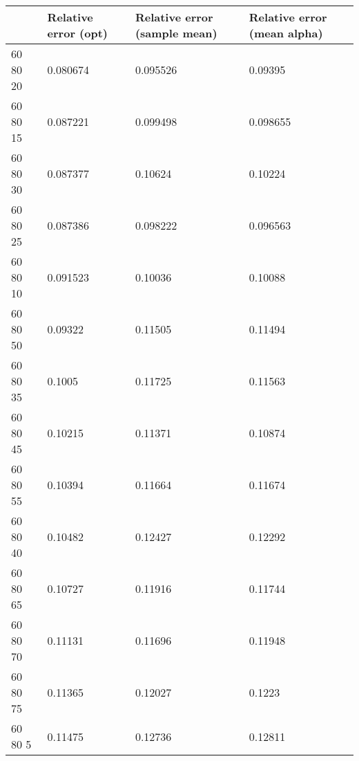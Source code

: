 \begin{tabular}{llll}
& Relative error (opt) & Relative error (sample mean) & Relative error (mean alpha) \\ 
\hline 
60  80  20 & 0.080674 & 0.095526 & 0.09395 \\ \hline 
60  80  15 & 0.087221 & 0.099498 & 0.098655 \\ \hline 
60  80  30 & 0.087377 & 0.10624 & 0.10224 \\ \hline 
60  80  25 & 0.087386 & 0.098222 & 0.096563 \\ \hline 
60  80  10 & 0.091523 & 0.10036 & 0.10088 \\ \hline 
60  80  50 & 0.09322 & 0.11505 & 0.11494 \\ \hline 
60  80  35 & 0.1005 & 0.11725 & 0.11563 \\ \hline 
60  80  45 & 0.10215 & 0.11371 & 0.10874 \\ \hline 
60  80  55 & 0.10394 & 0.11664 & 0.11674 \\ \hline 
60  80  40 & 0.10482 & 0.12427 & 0.12292 \\ \hline 
60  80  65 & 0.10727 & 0.11916 & 0.11744 \\ \hline 
60  80  70 & 0.11131 & 0.11696 & 0.11948 \\ \hline 
60  80  75 & 0.11365 & 0.12027 & 0.1223 \\ \hline 
60  80   5 & 0.11475 & 0.12736 & 0.12811 \\ \hline 
\hline 
\end{tabular}